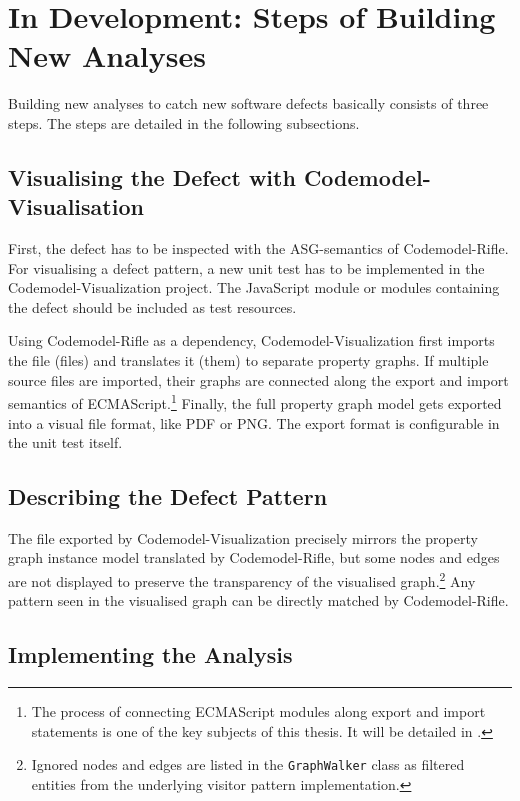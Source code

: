 \section{In Development: Steps of Building New Analyses}

Building new analyses to catch new software defects basically consists of three steps. The steps are detailed in the following subsections.


\subsection{Visualising the Defect with Codemodel-Visualisation}

First, the defect has to be inspected with the ASG-semantics of Codemodel-Rifle. For visualising a defect pattern, a new unit test has to be implemented in the Codemodel-Visualization project. The JavaScript module or modules containing the defect should be included as test resources.

Using Codemodel-Rifle as a dependency, Codemodel-Visualization first imports the file (files) and translates it (them) to separate property graphs. If multiple source files are imported, their graphs are connected along the export and import semantics of ECMAScript.\footnote{The process of connecting ECMAScript modules along export and import statements is one of the key subjects of this thesis. It will be detailed in .} Finally, the full property graph model gets exported into a visual file format, like PDF or PNG. The export format is configurable in the unit test itself.


\subsection{Describing the Defect Pattern}

The file exported by Codemodel-Visualization precisely mirrors the property graph instance model translated by Codemodel-Rifle, but some nodes and edges are not displayed to preserve the transparency of the visualised graph.\footnote{Ignored nodes and edges are listed in the \texttt{GraphWalker} class as filtered entities from the underlying visitor pattern implementation.} Any pattern seen in the visualised graph can be directly matched by Codemodel-Rifle.


\subsection{Implementing the Analysis}
\label{subsection:implementing-analyses}

